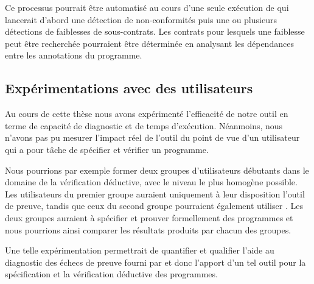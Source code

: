 Ce processus pourrait être automatisé au cours d'une seule exécution de \stady
qui lancerait d'abord une détection de non-conformités puis une ou plusieurs
détections de faiblesses de sous-contrats.
Les contrats pour lesquels une faiblesse peut être recherchée pourraient être
déterminée en analysant les dépendances entre les annotations du programme.


\subsection{Expérimentations avec des utilisateurs}


Au cours de cette thèse nous avons expérimenté l'efficacité de notre outil en
terme de capacité de diagnostic et de temps d'exécution.
Néanmoins, nous n'avons pas pu mesurer l'impact réel de l'outil du point de vue
d'un utilisateur qui a pour tâche de spécifier et vérifier un programme.

Nous pourrions par exemple former deux groupes d'utilisateurs débutants dans le
domaine de la vérification déductive, avec le niveau le plus homogène possible.
Les utilisateurs du premier groupe auraient uniquement à leur disposition
l'outil de preuve, tandis que ceux du second groupe pourraient également
utiliser \stady.
Les deux groupes auraient à spécifier et prouver formellement des programmes
et nous pourrions ainsi comparer les résultats produits par chacun des groupes.

Une telle expérimentation permettrait de quantifier et qualifier l'aide au
diagnostic des échecs de preuve fourni par \stady et donc l'apport d'un tel
outil pour la spécification et la vérification déductive des programmes.
